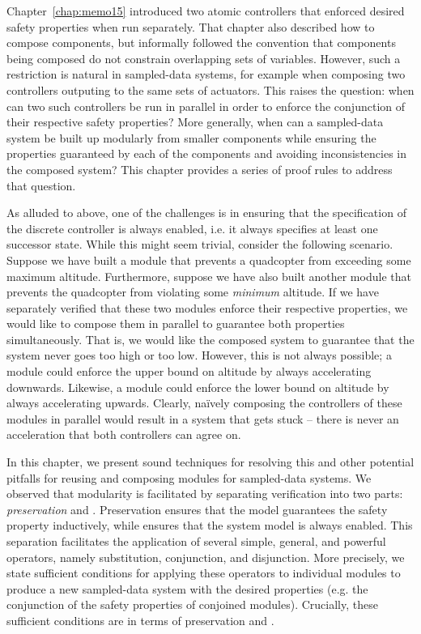 Chapter~\ref{chap:memo15} introduced two atomic controllers that enforced
desired safety properties when run separately. That chapter also described
how to compose components, but informally followed the convention that
components being composed do not constrain overlapping sets of
variables. However, such a restriction is natural in sampled-data systems,
for example when composing two controllers outputing to the same sets of
actuators. This raises the question: when can two such controllers be run
in parallel in order to enforce the conjunction of their respective safety
properties? More generally, when can a sampled-data system be built up
modularly from smaller components while ensuring the properties guaranteed
by each of the components and avoiding inconsistencies in the composed
system? This chapter provides a series of proof rules to address that
question.

As alluded to above, one of the challenges is in ensuring that the
specification of the discrete controller is always enabled, i.e. it always
specifies at least one successor state.  While this might seem trivial,
consider the following scenario.  Suppose we have built a module that
prevents a quadcopter from exceeding some maximum altitude.  Furthermore,
suppose we have also built another module that prevents the quadcopter from
violating some \emph{minimum} altitude.  If we have separately verified
that these two modules enforce their respective properties, we would like
to compose them in parallel to guarantee both properties simultaneously.
That is, we would like the composed system to guarantee that the system
never goes too high or too low.  However, this is not always possible; a
module could enforce the upper bound on altitude by always accelerating
downwards.  Likewise, a module could enforce the lower bound on altitude by
always accelerating upwards.  Clearly, na\"ively composing the controllers
of these modules in parallel would result in a system that gets stuck --
there is never an acceleration that both controllers can agree on.

In this chapter, we present sound techniques for resolving this and other
potential pitfalls for reusing and composing modules for sampled-data
systems.  We observed that modularity is facilitated by separating
verification into two parts: \emph{preservation} and \emph{\progress{}}.
Preservation ensures that the model guarantees the safety property
inductively, while \progress{} ensures that the system model is always
enabled.  This separation facilitates the application of several simple,
general, and powerful operators, namely substitution, conjunction, and
disjunction.  More precisely, we state sufficient conditions for applying
these operators to individual modules to produce a new sampled-data system
with the desired properties (e.g. the conjunction of the safety properties
of conjoined modules).  Crucially, these sufficient conditions are in terms
of preservation and \progress{}.

